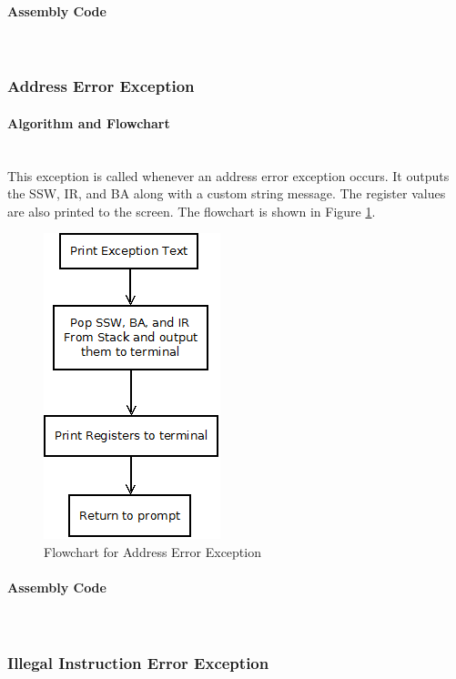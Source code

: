\documentclass[12pt]{article}
\begin{document}
			\paragraph{Assembly Code}~\\				
			
			
		
			\subsubsection{Address Error Exception}
			\paragraph{Algorithm and Flowchart}~\\
			This exception is called whenever an address error exception occurs. It outputs the SSW, IR, and BA along with a custom string message. The register values are also printed to the screen. The flowchart is shown in Figure \ref{fig:AERR}.
			
				\begin{figure}[H]
					\centering
					\includegraphics[width=0.3\linewidth]{BERR}
					\caption{Flowchart for Address Error Exception}
					\label{fig:AERR}
				\end{figure}
			\paragraph{Assembly Code}~\\			
			
			\subsubsection{Illegal Instruction Error Exception}
\end{document}
